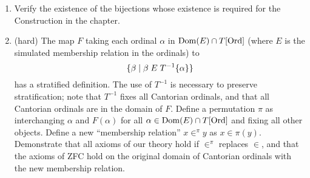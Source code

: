 \Exercises


\begin{enumerate}
 \item  Verify the existence of the bijections whose existence is required for
   the Construction in the chapter.

 \item  (hard) The map $F$ taking each ordinal $\alpha$ in $\mathop{\mathrm{Dom}}(E) \cap
   T[\mathrm{Ord}]$ (where $E$ is the simulated membership
   relation in the ordinals) to 
   $$
    \{\beta \mid \beta\mathrel{E} T^{-1}\{\alpha\}\}
   $$
   has a stratified definition.
   The use of $T^{-1}$ is necessary to preserve stratification; note that
   $T^{-1}$ fixes all Cantorian ordinals, and that all
   Cantorian ordinals are in the domain of $F$.  Define a
   permutation $\pi$ as interchanging $\alpha$ and $F(\alpha)$ for all $\alpha
   \in \mathop{\mathrm{Dom}}(E) \cap T[\mathrm{Ord}]$ and fixing all other objects.  Define a
   new ``membership relation'' $x \in^{\pi} y$ as $x \in \pi(y)$.  Demonstrate
   that all axioms of our theory hold if $\in^{\pi}$ replaces $\in$, and that
   the axioms of ZFC hold on the
   original domain of Cantorian ordinals with the new
   membership relation.
\end{enumerate}
